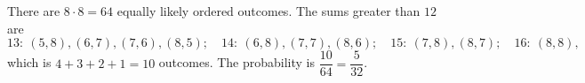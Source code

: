 There are $8\cdot8=64$ equally likely ordered outcomes. The sums greater than $12$ are
\[
13:\ (5,8),(6,7),(7,6),(8,5);\quad 14:\ (6,8),(7,7),(8,6);\quad 15:\ (7,8),(8,7);\quad 16:\ (8,8),
\]
which is $4+3+2+1=10$ outcomes. The probability is $\dfrac{10}{64}=\boxed{\dfrac{5}{32}}$.
